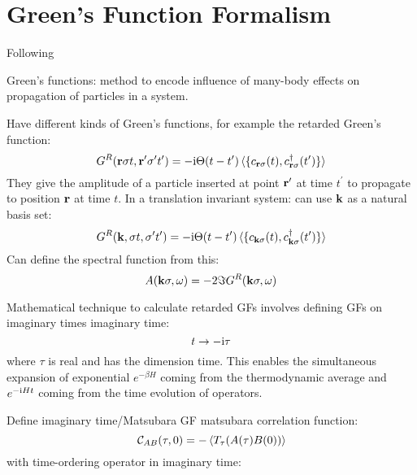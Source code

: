\documentclass[../main.tex]{subfiles}
\begin{document}
\chapter{Green's Function Formalism}\label{ch:green's-function-formalism}

Following~\cite{Bruus_Flensberg_2004}

Green's functions: method to encode influence of many-body effects on propagation of particles in a system.

Have different kinds of Green's functions, for example the retarded Green's function:
\begin{equation}
    G^R (\bm{\mathrm{r}}\sigma t, \bm{\mathrm{r}}^{\prime} \sigma^{\prime} t^{\prime}) = -\mathrm{i} \Theta(t- t^{\prime}) \braket{ \{c_{\bm{\mathrm{r}} \sigma} (t), c_{\bm{\mathrm{r}} \sigma}^{\dagger} (t^{\prime})\}}
\end{equation}
They give the amplitude of a particle inserted at point \(\bm{\mathrm{r}}^{\prime}\) at time \(t^{\prime}\) to propagate to position \(\bm{\mathrm{r}}\) at time \(t\).
In a translation invariant system: can use \(\bm{\mathrm{k}}\) as a natural basis set:
\begin{equation}
    G^R (\bm{\mathrm{k}}, \sigma t, \sigma^{\prime} t^{\prime}) = -\mathrm{i} \Theta(t- t^{\prime}) \braket{ \{c_{\bm{\mathrm{k}} \sigma} (t), c_{\bm{\mathrm{k}} \sigma}^{\dagger} (t^{\prime})\}}
\end{equation}
Can define the spectral function from this:
\begin{equation}
    A(\bm{\mathrm{k}} \sigma, \omega) = -2 \Im G^R (\bm{\mathrm{k}} \sigma, \omega)
\end{equation}


Mathematical technique to calculate retarded GFs involves defining GFs on imaginary times \gls{imaginary time}:
\begin{equation}
    t \to -\mathrm{i} \tau
\end{equation}
where \(\tau\) is real and has the dimension time.
This enables the simultaneous expansion of exponential \(e^{-\beta H}\) coming from the thermodynamic average and \(e^{-\mathrm{i} H t}\) coming from the time evolution of operators.


Define imaginary time/Matsubara GF \gls{matsubara correlation function}:
\begin{equation}
    \mathcal{C}_{A B} (\tau, 0) = - \Braket{T_{\tau} (A(\tau) B(0))}
\end{equation}
with time-ordering operator in imaginary time: 
\end{document}
